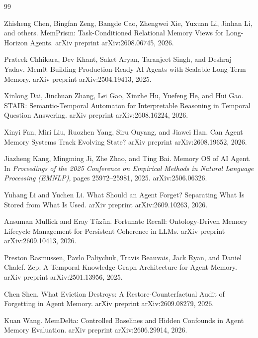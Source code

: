 \documentclass[11pt]{article}
\begin{document}
\begin{thebibliography}{99}

Zhisheng Chen, Bingfan Zeng, Bangde Cao, Zhengwei Xie, Yuxuan Li, Jinhan Li, and others.
MemPrism: Task-Conditioned Relational Memory Views for Long-Horizon Agents.
arXiv preprint arXiv:2608.06745, 2026.

Prateek Chhikara, Dev Khant, Saket Aryan, Taranjeet Singh, and Deshraj Yadav.
Mem0: Building Production-Ready AI Agents with Scalable Long-Term Memory.
arXiv preprint arXiv:2504.19413, 2025.

Xinlong Dai, Jinchuan Zhang, Lei Gao, Xinzhe Hu, Yuefeng He, and Hui Gao.
STAIR: Semantic-Temporal Automaton for Interpretable Reasoning in Temporal Question Answering.
arXiv preprint arXiv:2608.16224, 2026.

Xinyi Fan, Miri Liu, Ruozhen Yang, Siru Ouyang, and Jiawei Han.
Can Agent Memory Systems Track Evolving State?
arXiv preprint arXiv:2608.19652, 2026.

Jiazheng Kang, Mingming Ji, Zhe Zhao, and Ting Bai.
Memory OS of AI Agent.
In \emph{Proceedings of the 2025 Conference on Empirical Methods in Natural Language Processing (EMNLP)}, pages 25972--25981, 2025.
arXiv:2506.06326.

Yuhang Li and Yuchen Li.
What Should an Agent Forget? Separating What Is Stored from What Is Used.
arXiv preprint arXiv:2609.10263, 2026.

Ansuman Mullick and Eray T\"{u}z\"{u}n.
Fortunate Recall: Ontology-Driven Memory Lifecycle Management for Persistent Coherence in LLMs.
arXiv preprint arXiv:2609.10413, 2026.

Preston Rasmussen, Pavlo Paliychuk, Travis Beauvais, Jack Ryan, and Daniel Chalef.
Zep: A Temporal Knowledge Graph Architecture for Agent Memory.
arXiv preprint arXiv:2501.13956, 2025.

Chen Shen.
What Eviction Destroys: A Restore-Counterfactual Audit of Forgetting in Agent Memory.
arXiv preprint arXiv:2609.08279, 2026.

Kuan Wang.
MemDelta: Controlled Baselines and Hidden Confounds in Agent Memory Evaluation.
arXiv preprint arXiv:2606.29914, 2026.


\end{thebibliography}
\end{document}
